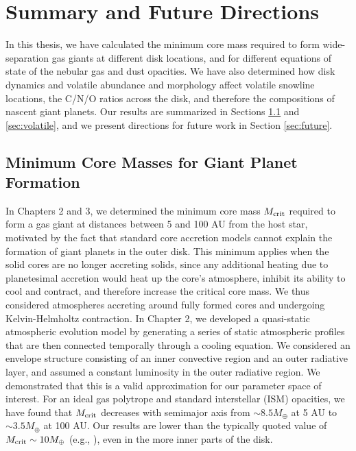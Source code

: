 \chapter{Summary and Future Directions}
\label{conclusion}

In this thesis, we have calculated the minimum core mass required to form wide-separation gas giants at different disk locations, and for different equations of state of the nebular gas and dust opacities. We have also determined how disk dynamics and volatile abundance and morphology affect volatile snowline locations, the C/N/O ratios across the disk, and therefore the compositions of nascent giant planets. Our results are summarized in Sections \ref{sec:core} and \ref{sec:volatile}, and we present directions for future work in Section \ref{sec:future}. 

\section{Minimum Core Masses for Giant Planet Formation}
\label{sec:core}

In Chapters 2 and 3, we determined the minimum core mass $M_{\rm crit}$ required to form a gas giant at distances between 5 and 100 AU from the host star, motivated by the fact that standard core accretion models cannot explain the formation of giant planets in the outer disk. This minimum applies when the solid cores are no longer accreting solids, since any additional heating due to planetesimal accretion would heat up the core's atmosphere, inhibit its ability to cool and contract, and therefore increase the critical core mass. We thus considered atmospheres accreting around fully formed cores and undergoing Kelvin-Helmholtz contraction. In Chapter 2, we developed a quasi-static atmospheric evolution model by generating a series of static atmospheric profiles that are then connected temporally through a cooling equation. We considered an envelope structure consisting of an inner convective region and an outer radiative layer, and assumed a constant luminosity in the outer radiative region. We demonstrated that this is a valid approximation for our parameter space of interest. For an ideal gas polytrope and standard interstellar (ISM) opacities, we have found that $M_{\rm crit}$ decreases with semimajor axis from $\sim 8.5 M_{\oplus}$ at 5 AU to $\sim 3.5 M_{\oplus}$ at 100 AU. Our results are lower than the typically quoted value of $M_{\rm crit} \sim 10 M_{\oplus}$ (e.g., \citealt{rafikov06}), even in the more inner parts of the disk. 

